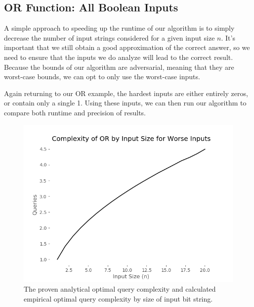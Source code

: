 \subsection{OR Function: All Boolean Inputs}

A simple approach to speeding up the runtime of our
algorithm is to simply decrease the number of input
strings considered for a given input size $n$. It's
important that we still obtain a good approximation
of the correct answer, so we need to ensure that the
inputs we do analyze will lead to the correct result.
Because the bounds of our algorithm are adversarial,
meaning that they are worst-case bounds, we can opt
to only use the worst-case inputs.

Again returning to our OR example, the hardest inputs are
either entirely zeros, or contain only a single 1. 
Using these inputs, we can then run our algorithm to 
compare both runtime and precision of results.

\begin{figure}[ht]
\centering
\includegraphics[scale=.5]{figures/or_worst_complexity.png}
\caption{The proven analytical optimal query complexity
and calculated empirical optimal query complexity by 
size of input bit string.}
\label{fig:or_worst_complexity}
\end{figure}

